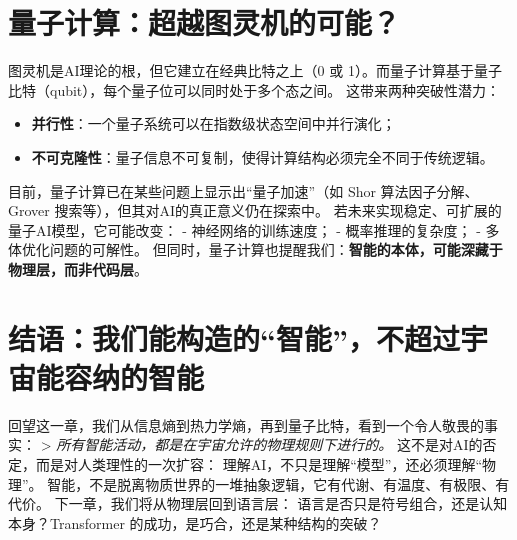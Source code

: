 \section*{量子计算：超越图灵机的可能？}
图灵机是AI理论的根，但它建立在经典比特之上（0 或 1）。而量子计算基于量子比特（qubit），每个量子位可以同时处于多个态之间。
这带来两种突破性潜力：
\begin{itemize}
\item \textbf{并行性}：一个量子系统可以在指数级状态空间中并行演化；
\item \textbf{不可克隆性}：量子信息不可复制，使得计算结构必须完全不同于传统逻辑。
\end{itemize}
目前，量子计算已在某些问题上显示出“量子加速”（如 Shor 算法因子分解、Grover 搜索等），但其对AI的真正意义仍在探索中。
若未来实现稳定、可扩展的量子AI模型，它可能改变：
- 神经网络的训练速度；
- 概率推理的复杂度；
- 多体优化问题的可解性。
但同时，量子计算也提醒我们：\textbf{智能的本体，可能深藏于物理层，而非代码层}。
\section*{结语：我们能构造的“智能”，不超过宇宙能容纳的智能}
回望这一章，我们从信息熵到热力学熵，再到量子比特，看到一个令人敬畏的事实：
> \textit{所有智能活动，都是在宇宙允许的物理规则下进行的。}
这不是对AI的否定，而是对人类理性的一次扩容：
理解AI，不只是理解“模型”，还必须理解“物理”。
智能，不是脱离物质世界的一堆抽象逻辑，它有代谢、有温度、有极限、有代价。
下一章，我们将从物理层回到语言层：
语言是否只是符号组合，还是认知本身？Transformer 的成功，是巧合，还是某种结构的突破？
\nocite{*}
\printbibliography[heading=bibintoc, title=\ebibname]
\newpage
